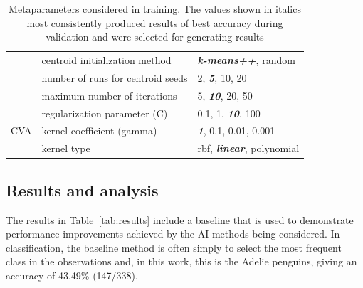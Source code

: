 \documentclass[12pt]{article}
\begin{document}
\begin{table}
\begin{center}
\begin{tabular}{l|l|l}
                              & centroid initialization method         & \textit{\textbf{k-means++}}, random \\
                              & number of runs for centroid seeds	     & 2, \textit{\textbf{5}}, 10, 20 \\
                              & maximum number of iterations           & 5, \textit{\textbf{10}}, 20, 50 \\
  \hline
    \multirow{3}{*}{CVA} & regularization parameter (C)  & 0.1, 1, \textit{\textbf{10}}, 100 \\
                          & kernel coefficient (gamma)   & \textit{\textbf{1}}, 0.1, 0.01, 0.001 \\
                          & kernel type                  & rbf, \textit{\textbf{linear}}, polynomial \\
  \hline
  \end{tabular}
  \vspace{-1.5\baselineskip} %
  \end{center} 
  \caption{Metaparameters considered in training. 
  The values shown in italics most consistently produced results of 
  best accuracy during validation and were selected for generating results}
  \vspace{-1\baselineskip} %
  \label{tab:metaparameters}
\end{table} 

\subsection*{Results and analysis}

The results in Table~\ref{tab:results} include a baseline that is used to demonstrate performance improvements achieved by the AI methods being considered. 
In classification, the baseline method is often simply to select the most frequent class in the observations and, 
in this work, this is the Adelie penguins, giving an accuracy of 43.49\% (147/338).
\end{document}
